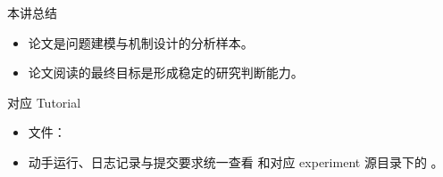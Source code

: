 \begin{frame}{本讲总结}
  \begin{itemize}
    \item 论文是问题建模与机制设计的分析样本。
    \item 论文阅读的最终目标是形成稳定的研究判断能力。
  \end{itemize}
\end{frame}

\LectureTenSources

\begin{frame}{对应 Tutorial}
  \begin{itemize}
    \item 文件：\texttt{}
    \item 动手运行、日志记录与提交要求统一查看 \texttt{} 和对应 experiment 源目录下的 \texttt{}。
  \end{itemize}
\end{frame}


